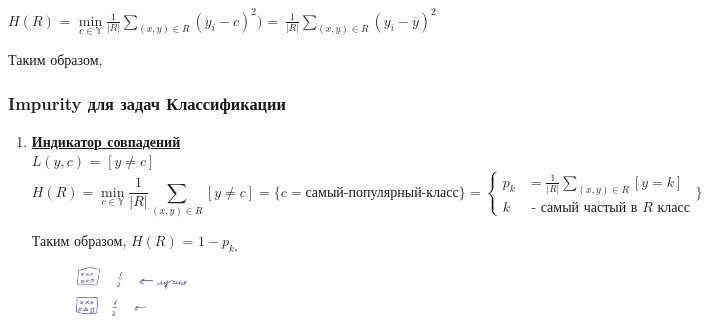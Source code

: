                 \begin{center}
                    $H(R)$ = $\min\limits_{c \in \mathbb{Y}}\frac{1}{|R|}\sum\limits_{(x, y) \in R}(y_i - c)^2)$ =\ $\frac{1}{|R|}\sum\limits_{(x, y) \in R}(y_i - \overline{y})^2$
                \end{center}
                Таким образом, \\


                \subsubsection{Impurity для задач Классификации}

                    \begin{enumerate}
                        \item \underline{\textbf{Индикатор совпадений}}\\
                        
                        $L(y, c)$ = $[y \neq c]$\\
 
                            \begin{equation}
                                H(R) = \min\limits_{c \in \mathbb{Y}}\frac{1}{|R|}\sum\limits_{(x, y) \in R} [y \neq c] = \{c = \textit{самый-популярный-класс} \} = \left\{
                                \begin{array}{ll}
                                   p_k &= \frac{1}{|R|}\sum\limits_{(x, y) \in R}[y = k] \\
                                  k &\text{ - самый частый в } R \text{ класс}
                                \end{array}
                                \}\right. 

                                
                                \end{equation}
                                \begin{center}
                                    Таким образом, $H(R)$ = $1 - p_{k_*}$
                                \end{center}

                                \begin{figure}[H]
                                    \centering
                                    \includegraphics[width=0.3\textwidth]{images/8lecture/bad_impurity.png}
                                \end{figure}



\end{enumerate}
